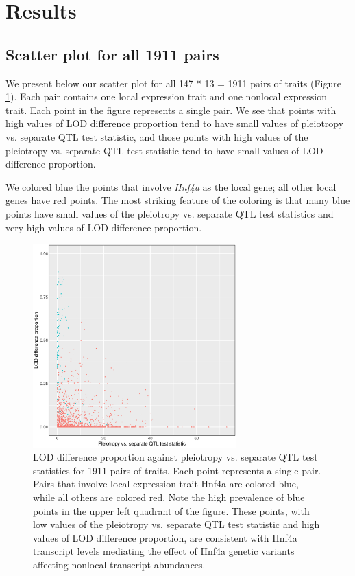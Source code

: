 \documentclass{article}
\begin{document}
\section{Results}

\subsection{Scatter plot for all 1911 pairs}

We present below our scatter plot for all 147 * 13 = 1911 pairs of traits (Figure \ref{fig:lod-diff-prop-v-lrt-all}). Each pair contains one local expression trait and one nonlocal expression trait. Each point in the figure represents a single pair. We see that points with high values of LOD difference proportion tend to have small values of pleiotropy vs. separate QTL test statistic, and those points with high values of the pleiotropy vs. separate QTL test statistic tend to have small values of LOD difference proportion. 

We colored blue the points that involve \emph{Hnf4a} as the local gene; all other local genes have red points. The most striking feature of the coloring is that many blue points have small values of the pleiotropy vs. separate QTL test statistics and very high values of LOD difference proportion. 



\begin{figure}
    \centering
    \includegraphics[width = 0.7\textwidth]{../Rmd/lod-diff-prop-v-lrt.eps}
    \caption{LOD difference proportion against pleiotropy vs. separate QTL test statistics for 1911 pairs of traits. Each point represents a single pair. Pairs that involve local expression trait Hnf4a are colored blue, while all others are colored red. Note the high prevalence of blue points in the upper left quadrant of the figure. These points, with low values of the pleiotropy vs. separate QTL test statistic and high values of LOD difference proportion, are consistent with Hnf4a transcript levels mediating the effect of Hnf4a genetic variants affecting nonlocal transcript abundances.}
    \label{fig:lod-diff-prop-v-lrt-all}
\end{figure}
\end{document}

